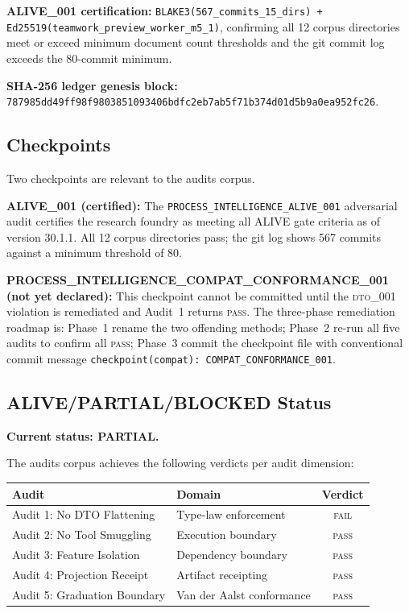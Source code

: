 \textbf{ALIVE\_001 certification:} \texttt{BLAKE3(567\_commits\_15\_dirs) +
Ed25519(teamwork\_preview\_worker\_m5\_1)}, confirming all 12 corpus directories
meet or exceed minimum document count thresholds and the git commit log exceeds
the 80-commit minimum.

\textbf{SHA-256 ledger genesis block:}
\texttt{787985dd49ff98f9803851093406bdfc2eb7ab5f71b374d01d5b9a0ea952fc26}.

\subsection{Checkpoints}
\label{sec:audits-evidence-checkpoints}

Two checkpoints are relevant to the audits corpus.

\textbf{ALIVE\_001 (certified):} The \texttt{PROCESS\_INTELLIGENCE\_ALIVE\_001}
adversarial audit certifies the research foundry as meeting all ALIVE gate
criteria as of version 30.1.1. All 12 corpus directories pass; the git log shows
567 commits against a minimum threshold of 80.

\textbf{PROCESS\_INTELLIGENCE\_COMPAT\_CONFORMANCE\_001 (not yet declared):}
This checkpoint cannot be committed until the \textsc{dto\_001} violation is
remediated and Audit~1 returns \textsc{pass}. The three-phase remediation roadmap
is: Phase~1 rename the two offending methods; Phase~2 re-run all five audits to
confirm all \textsc{pass}; Phase~3 commit the checkpoint file with conventional
commit message \texttt{checkpoint(compat): COMPAT\_CONFORMANCE\_001}.

\subsection{ALIVE/PARTIAL/BLOCKED Status}
\label{sec:audits-evidence-status}

\textbf{Current status: PARTIAL.}

The audits corpus achieves the following verdicts per audit dimension:

\begin{center}
\begin{tabular}{llc}
\hline
\textbf{Audit} & \textbf{Domain} & \textbf{Verdict} \\
\hline
Audit 1: No DTO Flattening & Type-law enforcement & \textsc{fail} \\
Audit 2: No Tool Smuggling & Execution boundary & \textsc{pass} \\
Audit 3: Feature Isolation & Dependency boundary & \textsc{pass} \\
Audit 4: Projection Receipt & Artifact receipting & \textsc{pass} \\
Audit 5: Graduation Boundary & Van der Aalst conformance & \textsc{pass} \\
\hline
\end{tabular}
\end{center}

